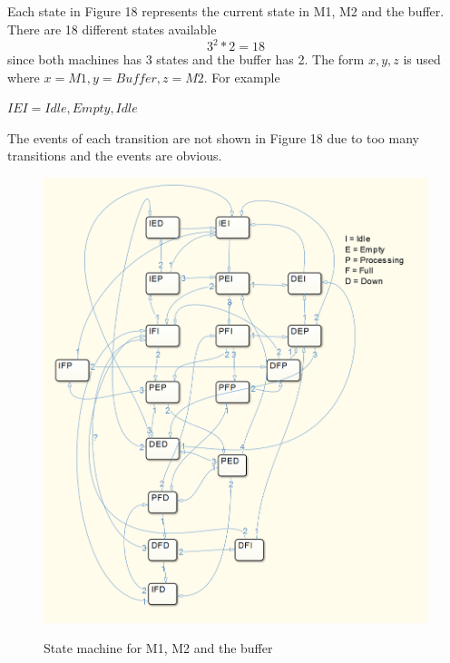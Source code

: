 \documentclass[12pt,a4paper]{article}
\begin{document}
\subsection{}
Each state in Figure 18 represents the current state in M1, M2 and the buffer. There are 18 different states available 
\begin{equation}
3^2*2 = 18
\end{equation}
since both machines has 3 states and the buffer has 2.
The form ${x,y,z}$ is used where $x=M1,y=Buffer,z=M2$. For example
\begin{center}
$IEI = {Idle,Empty,Idle}$
\end{center}
The events of each transition are not shown in Figure 18 due to too many transitions and the events are obvious.
\begin{center}
	\begin{figure}[H]
      \centering
	\includegraphics[scale=0.7]{des2.png}
	\label{fig:des1}
	\caption{State machine for M1, M2 and the buffer}
	\end{figure}
\end{center}
\end{document}
